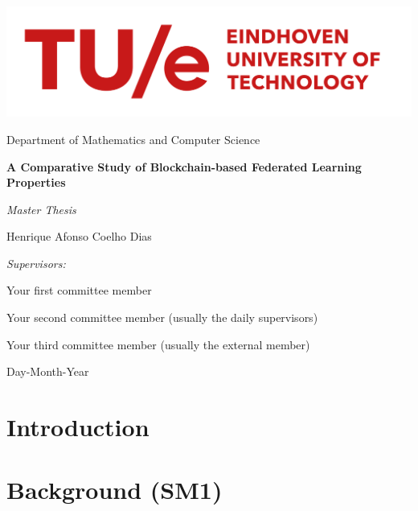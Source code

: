 \documentclass[12pt,a4paper,footinclude=true,twoside,headinclude=true]{report}
\begin{document}
\begin{titlepage}
\centering
\includegraphics[width=0.7\linewidth]{tue-logo.png}\par
Department of Mathematics and Computer Science

\vspace{3cm}
{\LARGE\textbf{A Comparative Study of Blockchain-based Federated Learning Properties}}\par\vspace{0.5cm}
{\large\textit{Master Thesis}}\par\vspace{1cm}
{\large Henrique Afonso Coelho Dias}\par

\vfill

\emph{Supervisors:}\par
Your first committee member\par
Your second committee member (usually the daily supervisors)\par
Your third committee member (usually the external member)\par

\vspace{2cm}

{Day-Month-Year}

\end{titlepage}

\begin{abstract}

\end{abstract}

\tableofcontents


\chapter{Introduction}\label{sec:introduction}

\cite{8894364}

\chapter{Background (SM1)}\label{sec:background}
\end{document}
